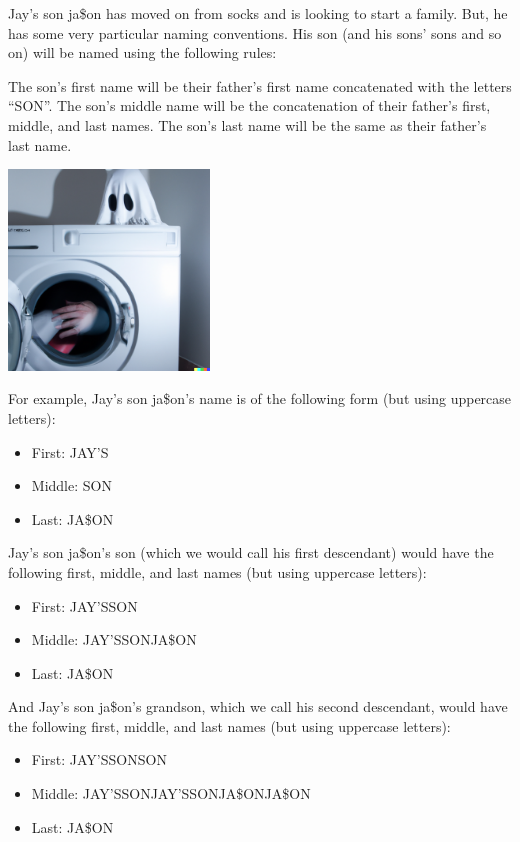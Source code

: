 
Jay's son ja\$on has moved on from socks and is looking to start a family. But,
he has some very particular naming conventions. His son (and his sons' sons and so on)
will be named using the following rules:

The son's first name will be their father's first name concatenated with the letters ``SON''.
The son's middle name will be the concatenation of their father's first, middle, and last names.
The son's last name will be the same as their father's last name.

\begin{center}
    \includegraphics[width=0.4\textwidth]{fig}
\end{center}

For example, Jay's son ja\$on's name is of the following form (but using uppercase letters):

\begin{itemize}
\item First: JAY'S
\item Middle: SON
\item Last: JA\$ON
\end{itemize}

Jay's son ja\$on's son (which we would call his first descendant) would have the following
first, middle, and last names (but using uppercase letters):

\begin{itemize}
\item First: JAY'SSON
\item Middle: JAY'SSONJA\$ON
\item Last: JA\$ON
\end{itemize}

And Jay's son ja\$on's grandson, which we call his second descendant, would
have the following first, middle, and last names (but using uppercase letters):

\begin{itemize}
\item First: JAY'SSONSON
\item Middle: JAY'SSONJAY'SSONJA\$ONJA\$ON
\item Last: JA\$ON
\end{itemize}

